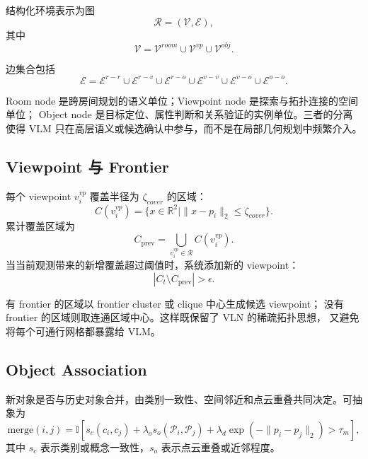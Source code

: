 \documentclass[UTF8,zihao=-4]{ctexart}
\begin{document}
结构化环境表示为图
\begin{equation}
  \mathcal{R}=(\mathcal{V},\mathcal{E}),
\end{equation}
其中
\begin{equation}
  \mathcal{V}
  =
  \mathcal{V}^{room}
  \cup
  \mathcal{V}^{vp}
  \cup
  \mathcal{V}^{obj}.
\end{equation}

边集合包括
\begin{equation}
  \mathcal{E}
  =
  \mathcal{E}^{r-r}
  \cup
  \mathcal{E}^{r-v}
  \cup
  \mathcal{E}^{r-o}
  \cup
  \mathcal{E}^{v-v}
  \cup
  \mathcal{E}^{v-o}
  \cup
  \mathcal{E}^{o-o}.
  \label{eq:edge_set}
\end{equation}

Room node 是跨房间规划的语义单位；Viewpoint node 是探索与拓扑连接的空间单位；
Object node 是目标定位、属性判断和关系验证的实例单位。三者的分离使得 VLM
只在高层语义或候选确认中参与，而不是在局部几何规划中频繁介入。

\subsection{Viewpoint 与 Frontier}

每个 viewpoint $v_i^{vp}$ 覆盖半径为 $\zeta_{cover}$ 的区域：
\begin{equation}
  C(v_i^{vp})
  =
  \{x\in\mathbb{R}^2 \mid \|x-p_i\|_2\le \zeta_{cover}\}.
\end{equation}
累计覆盖区域为
\begin{equation}
  C_{\mathrm{prev}}
  =
  \bigcup_{v_i^{vp}\in\mathcal{R}} C(v_i^{vp}).
\end{equation}
当当前观测带来的新增覆盖超过阈值时，系统添加新的 viewpoint：
\begin{equation}
  |C_t\setminus C_{\mathrm{prev}}|>\epsilon .
\end{equation}

有 frontier 的区域以 frontier cluster 或 clique 中心生成候选 viewpoint；
没有 frontier 的区域则取连通区域中心。这样既保留了 VLN 的稀疏拓扑思想，
又避免将每个可通行网格都暴露给 VLM。

\subsection{Object Association}

新对象是否与历史对象合并，由类别一致性、空间邻近和点云重叠共同决定。可抽象为
\begin{equation}
  \mathrm{merge}(i,j)
  =
  \mathbb{I}
  \left[
  s_c(c_i,c_j)
  + \lambda_o s_o(\mathcal{P}_i,\mathcal{P}_j)
  + \lambda_d \exp(-\|p_i-p_j\|_2)
  >
  \tau_m
  \right],
  \label{eq:object_merge}
\end{equation}
其中 $s_c$ 表示类别或概念一致性，$s_o$ 表示点云重叠或近邻程度。
\end{document}
